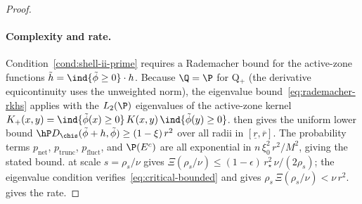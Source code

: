 \documentclass{article}
\begin{document}
\begin{proof}
\paragraph{Complexity and rate.}
Condition~\ref{cond:shell-ii-prime}
requires a Rademacher bound
for the active-zone functions
$\tilde h = \ind{\tilde\phi \ge 0} \cdot h$.
Because $\Q = \P$ for Q$_+$
(the derivative equicontinuity
uses the unweighted norm),
the eigenvalue bound~\eqref{eq:rademacher-rkhs}
applies with the $L_2(\P)$ eigenvalues
of the active-zone kernel
$K_+(x,y) = \ind{\tilde\phi(x) \ge 0}\,K(x,y)\,\ind{\tilde\phi(y) \ge 0}$.
then gives the uniform lower bound
$\hP D_{\chis}(\tilde\phi+h, \tilde\phi)
  \ge (1 - \xi)\, r^2$
over all radii in $[\underline{r}, \overline{r}]$.
The probability terms
$p_{\mathrm{net}}$, $p_{\mathrm{trunc}}$,
$p_{\mathrm{fluct}}$,
and $\P(E^c)$ are all exponential
in $n\, \xi_0^2\, r^2/M^2$,
giving the stated bound.
at scale $s = \rho_s/\nu$
gives $\Xi(\rho_s/\nu) \le (1-\epsilon)\, r_\star^2\, \nu/(2\rho_s)$;
the eigenvalue condition verifies~\eqref{eq:critical-bounded}
and gives
$\rho_s\, \Xi(\rho_s/\nu) < \nu\, r^2$.
gives the rate.
\end{proof}
\end{document}
